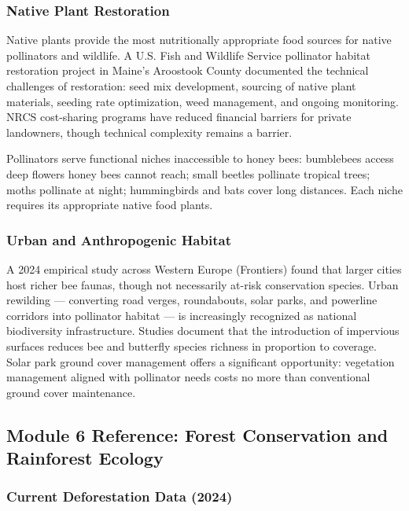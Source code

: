 \documentclass[11pt,letterpaper]{article}
\begin{document}
\subsubsection{Native Plant Restoration}

Native plants provide the most nutritionally appropriate food sources for native pollinators and wildlife. A U.S. Fish and Wildlife Service pollinator habitat restoration project in Maine's Aroostook County documented the technical challenges of restoration: seed mix development, sourcing of native plant materials, seeding rate optimization, weed management, and ongoing monitoring. NRCS cost-sharing programs have reduced financial barriers for private landowners, though technical complexity remains a barrier.

Pollinators serve functional niches inaccessible to honey bees: bumblebees access deep flowers honey bees cannot reach; small beetles pollinate tropical trees; moths pollinate at night; hummingbirds and bats cover long distances. Each niche requires its appropriate native food plants.

\subsubsection{Urban and Anthropogenic Habitat}

A 2024 empirical study across Western Europe (Frontiers) found that larger cities host richer bee faunas, though not necessarily at-risk conservation species. Urban rewilding --- converting road verges, roundabouts, solar parks, and powerline corridors into pollinator habitat --- is increasingly recognized as national biodiversity infrastructure. Studies document that the introduction of impervious surfaces reduces bee and butterfly species richness in proportion to coverage. Solar park ground cover management offers a significant opportunity: vegetation management aligned with pollinator needs costs no more than conventional ground cover maintenance.

\subsection{Module 6 Reference: Forest Conservation and Rainforest Ecology}

\subsubsection{Current Deforestation Data (2024)}
\end{document}
